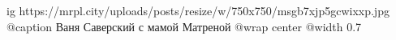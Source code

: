  
 
 
 
 

\ifcmt
  ig https://mrpl.city/uploads/posts/resize/w/750x750/msgb7xjp5gcwixxp.jpg
	@caption Ваня Саверский с мамой Матреной
  @wrap center
  @width 0.7
\fi
